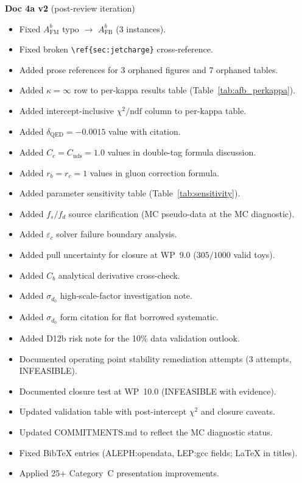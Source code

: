 \documentclass[11pt,a4paper]{article}
\begin{document}
\textbf{Doc 4a v2} (post-review iteration)
\begin{itemize}
\item Fixed $A_\mathrm{FM}^b$ typo $\to$ $A_\mathrm{FB}^b$ (3 instances).
\item Fixed broken \texttt{\textbackslash ref\{sec:jetcharge\}} cross-reference.
\item Added prose references for 3 orphaned figures and 7 orphaned tables.
\item Added $\kappa = \infty$ row to per-kappa results table (Table~\ref{tab:afb_perkappa}).
\item Added intercept-inclusive $\chi^2/\mathrm{ndf}$ column to per-kappa table.
\item Added $\delta_\mathrm{QED} = -0.0015$ value with citation.
\item Added $C_c = C_\mathrm{uds} = 1.0$ values in double-tag formula discussion.
\item Added $r_b = r_c = 1$ values in gluon correction formula.
\item Added parameter sensitivity table (Table~\ref{tab:sensitivity}).
\item Added $f_s/f_d$ source clarification (MC pseudo-data at the MC diagnostic).
\item Added $\varepsilon_c$ solver failure boundary analysis.
\item Added pull uncertainty for closure at WP~9.0 ($305/1000$ valid toys).
\item Added $C_b$ analytical derivative cross-check.
\item Added $\sigma_{d_0}$ high-scale-factor investigation note.
\item Added $\sigma_{d_0}$ form citation for flat borrowed systematic.
\item Added D12b risk note for the 10\% data validation outlook.
\item Documented operating point stability remediation attempts (3 attempts, INFEASIBLE).
\item Documented closure test at WP~10.0 (INFEASIBLE with evidence).
\item Updated validation table with post-intercept $\chi^2$ and closure caveats.
\item Updated COMMITMENTS.md to reflect the MC diagnostic status.
\item Fixed BibTeX entries (ALEPH:opendata, LEP:gcc fields; LaTeX in titles).
\item Applied 25+ Category~C presentation improvements.
\end{itemize}
\end{document}
